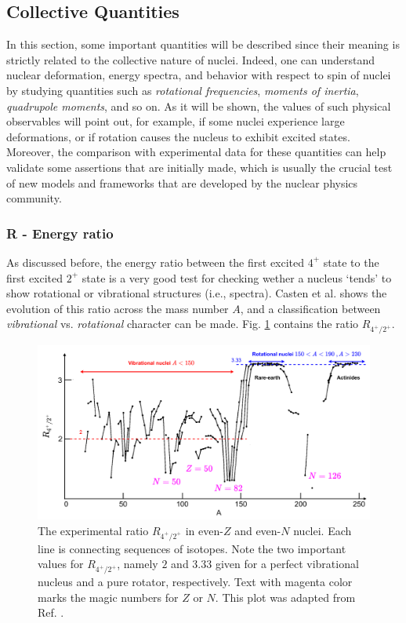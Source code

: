 \subsection{Collective Quantities}

In this section, some important quantities will be described since their meaning is strictly related to the collective nature of nuclei. Indeed, one can understand nuclear deformation, energy spectra, and behavior with respect to spin of nuclei by studying quantities such as \emph{rotational frequencies}, \emph{moments of inertia}, \emph{quadrupole moments}, and so on. As it will be shown, the values of such physical observables will point out, for example, if some nuclei experience large deformations, or if rotation causes the nucleus to exhibit excited states. Moreover, the comparison with experimental data for these quantities can help validate some assertions that are initially made, which is usually the crucial test of new models and frameworks that are developed by the nuclear physics community.

\subsubsection*{R - Energy ratio}

As discussed before, the energy ratio between the first excited $4^+$ state to the first excited $2^+$ state is a very good test for checking wether a nucleus `tends' to show rotational or vibrational structures (i.e., spectra). Casten et al. \cite{casten2000nuclear} shows the evolution of this ratio across the mass number $A$, and a classification between \emph{vibrational} vs. \emph{rotational} character can be made. Fig. \ref{4state-2state-ratio} contains the ratio $R_{4^+/2^+}$.

\begin{figure}
    \centering
    \includegraphics[scale=0.251]{Chapters/Figures/vibrations_rotations_E42-ratio.pdf}
    \caption{The experimental ratio $R_{4^+/2^+}$ in even-$Z$ and even-$N$ nuclei. Each line is connecting sequences of isotopes. Note the two important values for $R_{4^+/2^+}$, namely $2$ and $3.33$ given for a perfect vibrational nucleus and a pure rotator, respectively. Text with magenta color marks the magic numbers for $Z$ or $N$. This plot was adapted from Ref. \cite{casten2000nuclear}.}
    \label{4state-2state-ratio}
\end{figure}

